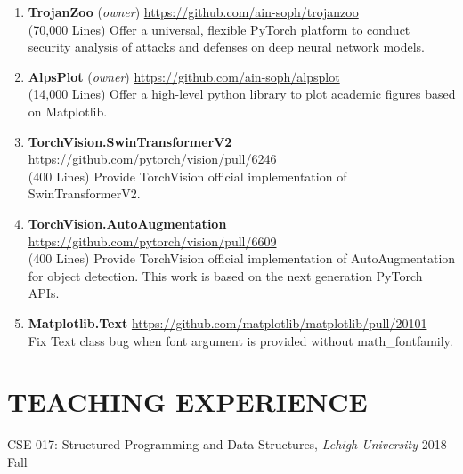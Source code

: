 \documentclass[letterpaper,11pt]{article}
\newcommand{\sociallink}[3]{\mbox{{#1}\hspace{0.5em}\href{#2}{#3}\hspace{1em}}}
\newcommand*{\website}[1]{\sociallink{\faGithub}{#1}{#1}}
\begin{document}
\begin{enumerate}[labelsep=15pt, parsep=4pt]

    \item \textbf{TrojanZoo} (\textit{owner}) \hfill \website{https://github.com/ain-soph/trojanzoo}
    \vspace{0.3em}\\
    (70,000 Lines) Offer a universal, flexible PyTorch platform to conduct security analysis of attacks and defenses on deep neural network models.

    \item \textbf{AlpsPlot} (\textit{owner}) \hfill \website{https://github.com/ain-soph/alpsplot}
    \vspace{0.3em}\\
    (14,000 Lines) Offer a high-level python library to plot academic figures based on Matplotlib.
    
    \item \textbf{TorchVision.SwinTransformerV2} \hfill
    \website{https://github.com/pytorch/vision/pull/6246}
    \vspace{0.3em}\\
    (400 Lines) Provide TorchVision official implementation of SwinTransformerV2.

    \item \textbf{TorchVision.AutoAugmentation} \hfill
    \website{https://github.com/pytorch/vision/pull/6609}
    \vspace{0.3em}\\
    (400 Lines) Provide TorchVision official implementation of AutoAugmentation for object detection. This work is based on the next generation PyTorch APIs.

    \item \textbf{Matplotlib.Text} \hfill
    \website{https://github.com/matplotlib/matplotlib/pull/20101}
    \vspace{0.3em}\\
    Fix Text class bug when font argument is provided without math\_fontfamily.


\end{enumerate}

\section{TEACHING EXPERIENCE}
CSE 017: Structured Programming and Data Structures, \textit{Lehigh University}  \hfill 2018 Fall \vspace{3pt}\\
\end{document}
